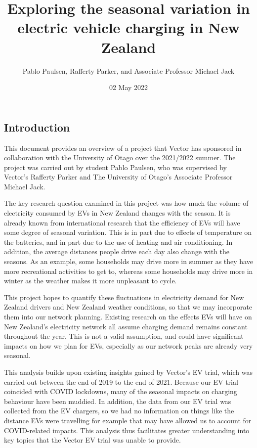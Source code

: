 \documentclass[
]{article}
\title{Exploring the seasonal variation in electric vehicle charging in
New Zealand}
\author{Pablo Paulsen, Rafferty Parker, and Associate Professor Michael
Jack}
\date{02 May 2022}
\begin{document}
\maketitle

\hypertarget{introduction}{%
\subsection{Introduction}\label{introduction}}

This document provides an overview of a project that Vector has
sponsored in collaboration with the University of Otago over the
2021/2022 summer. The project was carried out by student Pablo Paulsen,
who was supervised by Vector's Rafferty Parker and The University of
Otago's Associate Professor Michael Jack.

The key research question examined in this project was how much the
volume of electricity consumed by EVs in New Zealand changes with the
season. It is already known from international research that the
efficiency of EVs will have some degree of seasonal variation. This is
in part due to effects of temperature on the batteries, and in part due
to the use of heating and air conditioning. In addition, the average
distances people drive each day also change with the seasons. As an
example, some households may drive more in summer as they have more
recreational activities to get to, whereas some households may drive
more in winter as the weather makes it more unpleasant to cycle.

This project hopes to quantify these fluctuations in electricity demand
for New Zealand drivers and New Zealand weather conditions, so that we
may incorporate them into our network planning. Existing research on the
effects EVs will have on New Zealand's electricity network all assume
charging demand remains constant throughout the year. This is not a
valid assumption, and could have significant impacts on how we plan for
EVs, especially as our network peaks are already very seasonal.

This analysis builds upon existing insights gained by Vector's EV trial,
which was carried out between the end of 2019 to the end of 2021.
Because our EV trial coincided with COVID lockdowns, many of the
seasonal impacts on charging behaviour have been muddied. In addition,
the data from our EV trial was collected from the EV chargers, so we had
no information on things like the distance EVs were travelling for
example that may have allowed us to account for COVID-related impacts.
This analysis thus facilitates greater understanding into key topics
that the Vector EV trial was unable to provide.
\end{document}
